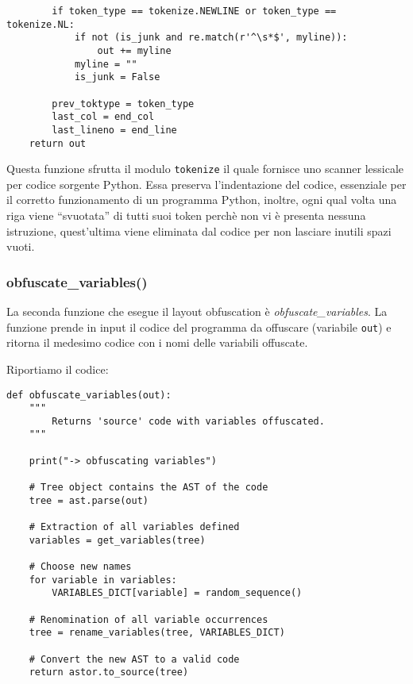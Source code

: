 \documentclass[a4paper,oneside,openright,titlepage,10pt,footinclude,headinclude]{scrbook}
\begin{document}
\begin{graybox}[innerleftmargin=2,]
\begin{lstlisting}
        if token_type == tokenize.NEWLINE or token_type == tokenize.NL:
            if not (is_junk and re.match(r'^\s*$', myline)):
                out += myline
            myline = ""
            is_junk = False

        prev_toktype = token_type
        last_col = end_col
        last_lineno = end_line
    return out
\end{lstlisting}
\end{graybox}
Questa funzione sfrutta il modulo \texttt{tokenize} il quale  fornisce uno scanner lessicale per codice sorgente Python.
Essa preserva l'indentazione del codice, essenziale per il corretto funzionamento di un programma Python, inoltre, ogni qual volta una  riga viene ``svuotata'' di tutti suoi token perchè non vi è presenta nessuna istruzione, quest'ultima viene eliminata dal codice per non lasciare inutili spazi vuoti.

\subsubsection{obfuscate\_variables()}

La seconda funzione che esegue il layout obfuscation è \emph{obfuscate\_variables}.
La funzione prende in input il codice del programma da offuscare (variabile \texttt{out}) e ritorna il medesimo codice con i nomi delle variabili offuscate.\medskip


\noindent Riportiamo il codice:
\begin{graybox}[innerleftmargin=2,]
\begin{lstlisting}
def obfuscate_variables(out):
    """
        Returns 'source' code with variables offuscated.
    """

    print("-> obfuscating variables")

    # Tree object contains the AST of the code
    tree = ast.parse(out)

    # Extraction of all variables defined
    variables = get_variables(tree)

    # Choose new names
    for variable in variables:
        VARIABLES_DICT[variable] = random_sequence()

    # Renomination of all variable occurrences
    tree = rename_variables(tree, VARIABLES_DICT)

    # Convert the new AST to a valid code
    return astor.to_source(tree)
\end{lstlisting}
\end{graybox}
\end{document}
